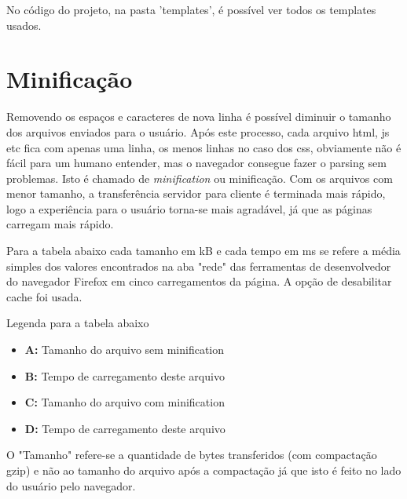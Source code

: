 No código do projeto, na pasta 'templates', é possível ver todos os templates usados.

\section{Minificação}

Removendo os espaços e caracteres de nova linha é possível diminuir o tamanho dos arquivos enviados
para o usuário. Após este processo, cada arquivo html, js etc fica com apenas uma linha, os menos linhas
no caso dos css, obviamente não é fácil para um humano entender, mas o navegador consegue fazer o 
parsing sem problemas. Isto é chamado de {\em minification} ou minificação. Com os arquivos
com menor tamanho, a transferência servidor para cliente é terminada mais rápido, logo a experiência
para o usuário torna-se mais agradável, já que as páginas carregam mais rápido.

Para a tabela abaixo cada tamanho em kB e cada tempo em ms se refere a média simples dos valores 
encontrados na aba "rede" das ferramentas de desenvolvedor do navegador Firefox em cinco 
carregamentos da página. A opção de desabilitar cache foi usada.

Legenda para a tabela abaixo
\begin{itemize}
\item \textbf{A:} Tamanho do arquivo sem minification
\item \textbf{B:} Tempo de carregamento deste arquivo
\item \textbf{C:} Tamanho do arquivo com minification
\item \textbf{D:} Tempo de carregamento deste arquivo
\end {itemize}

O "Tamanho" refere-se a quantidade de bytes transferidos (com compactação gzip) e não ao 
tamanho do arquivo após a compactação já que isto é feito no lado do usuário pelo navegador.

